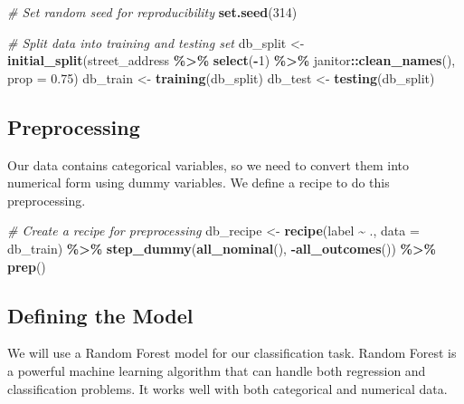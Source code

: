 \documentclass[
]{book}
\newenvironment{Shaded}{\begin{snugshade}}{\end{snugshade}}
\newcommand{\AttributeTok}[1]{\textcolor[rgb]{0.13,0.29,0.53}{#1}}
\newcommand{\CommentTok}[1]{\textcolor[rgb]{0.56,0.35,0.01}{\textit{#1}}}
\newcommand{\DecValTok}[1]{\textcolor[rgb]{0.00,0.00,0.81}{#1}}
\newcommand{\FloatTok}[1]{\textcolor[rgb]{0.00,0.00,0.81}{#1}}
\newcommand{\FunctionTok}[1]{\textcolor[rgb]{0.13,0.29,0.53}{\textbf{#1}}}
\newcommand{\NormalTok}[1]{#1}
\newcommand{\OtherTok}[1]{\textcolor[rgb]{0.56,0.35,0.01}{#1}}
\newcommand{\SpecialCharTok}[1]{\textcolor[rgb]{0.81,0.36,0.00}{\textbf{#1}}}
\begin{document}
\begin{Shaded}
\begin{Highlighting}[]
\CommentTok{\# Set random seed for reproducibility}
\FunctionTok{set.seed}\NormalTok{(}\DecValTok{314}\NormalTok{)}

\CommentTok{\# Split data into training and testing set}
\NormalTok{db\_split }\OtherTok{\textless{}{-}} \FunctionTok{initial\_split}\NormalTok{(street\_address }\SpecialCharTok{\%\textgreater{}\%} \FunctionTok{select}\NormalTok{(}\SpecialCharTok{{-}}\DecValTok{1}\NormalTok{) }\SpecialCharTok{\%\textgreater{}\%}\NormalTok{ janitor}\SpecialCharTok{::}\FunctionTok{clean\_names}\NormalTok{(), }\AttributeTok{prop =} \FloatTok{0.75}\NormalTok{)}
\NormalTok{db\_train }\OtherTok{\textless{}{-}} \FunctionTok{training}\NormalTok{(db\_split)}
\NormalTok{db\_test }\OtherTok{\textless{}{-}} \FunctionTok{testing}\NormalTok{(db\_split)}
\end{Highlighting}
\end{Shaded}

\hypertarget{preprocessing}{%
\subsection{Preprocessing}\label{preprocessing}}

Our data contains categorical variables, so we need to convert them into numerical form using dummy variables. We define a recipe to do this preprocessing.

\begin{Shaded}
\begin{Highlighting}[]
\CommentTok{\# Create a recipe for preprocessing}
\NormalTok{db\_recipe }\OtherTok{\textless{}{-}} \FunctionTok{recipe}\NormalTok{(label }\SpecialCharTok{\textasciitilde{}}\NormalTok{ ., }\AttributeTok{data =}\NormalTok{ db\_train) }\SpecialCharTok{\%\textgreater{}\%}
  \FunctionTok{step\_dummy}\NormalTok{(}\FunctionTok{all\_nominal}\NormalTok{(), }\SpecialCharTok{{-}}\FunctionTok{all\_outcomes}\NormalTok{()) }\SpecialCharTok{\%\textgreater{}\%}
  \FunctionTok{prep}\NormalTok{()}
\end{Highlighting}
\end{Shaded}

\hypertarget{defining-the-model}{%
\subsection{Defining the Model}\label{defining-the-model}}

We will use a Random Forest model for our classification task. Random Forest is a powerful machine learning algorithm that can handle both regression and classification problems. It works well with both categorical and numerical data.
\end{document}
